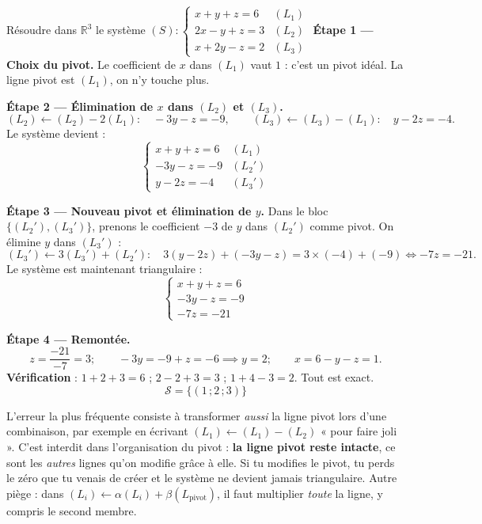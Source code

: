 \documentclass[11pt]{article}
\begin{document}
\begin{exoresolu}
Résoudre dans $\mathbb{R}^3$ le système $(S) : \begin{cases} x + y + z = 6 & (L_1)\\ 2x - y + z = 3 & (L_2)\\ x + 2y - z = 2 & (L_3) \end{cases}$
\tcblower
\textbf{Étape 1 — Choix du pivot.} Le coefficient de $x$ dans $(L_1)$ vaut $1$ : c'est un pivot idéal. La ligne pivot est $(L_1)$, on n'y touche plus.

\textbf{Étape 2 — Élimination de $x$ dans $(L_2)$ et $(L_3)$.}
\[
(L_2) \leftarrow (L_2) - 2(L_1) : \quad -3y - z = -9,
\qquad
(L_3) \leftarrow (L_3) - (L_1) : \quad y - 2z = -4.
\]
Le système devient :
\[
\begin{cases} x + y + z = 6 & (L_1)\\ -3y - z = -9 & (L_2')\\ y - 2z = -4 & (L_3') \end{cases}
\]

\textbf{Étape 3 — Nouveau pivot et élimination de $y$.} Dans le bloc $\{(L_2'),(L_3')\}$, prenons le coefficient $-3$ de $y$ dans $(L_2')$ comme pivot. On élimine $y$ dans $(L_3')$ :
\[
(L_3') \leftarrow 3(L_3') + (L_2') : \quad 3(y - 2z) + (-3y - z) = 3\times(-4) + (-9) \iff -7z = -21.
\]
Le système est maintenant triangulaire :
\[
\begin{cases} x + y + z = 6 \\ -3y - z = -9 \\ -7z = -21 \end{cases}
\]

\textbf{Étape 4 — Remontée.}
\[
z = \frac{-21}{-7} = 3 ; \qquad -3y = -9 + z = -6 \implies y = 2 ; \qquad x = 6 - y - z = 1.
\]
\textbf{Vérification} : $1+2+3=6$ ; $2-2+3=3$ ; $1+4-3=2$. Tout est exact.
\[
\boxed{\mathcal{S} = \{(1\,;2\,;3)\}}
\]
\end{exoresolu}

\begin{attention}
L'erreur la plus fréquente consiste à transformer \emph{aussi} la ligne pivot lors d'une combinaison, par exemple en écrivant $(L_1) \leftarrow (L_1) - (L_2)$ « pour faire joli ». C'est interdit dans l'organisation du pivot : \textbf{la ligne pivot reste intacte}, ce sont les \emph{autres} lignes qu'on modifie grâce à elle. Si tu modifies le pivot, tu perds le zéro que tu venais de créer et le système ne devient jamais triangulaire. Autre piège : dans $(L_i) \leftarrow \alpha(L_i) + \beta(L_{\text{pivot}})$, il faut multiplier \emph{toute} la ligne, y compris le second membre.
\end{attention}
\end{document}
